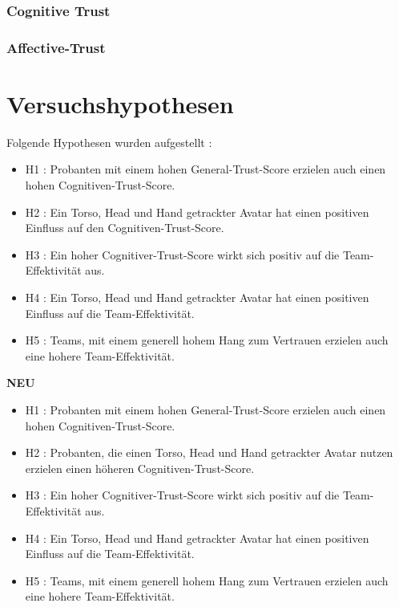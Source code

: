 \documentclass[a4paper,11pt]{article}%
\renewcommand{\\}{\vspace*{0.5\baselineskip} \newline}
\begin{document}
		\subsubsection{Cognitive Trust}
		
		\subsubsection{Affective-Trust}
		
	\newpage
	\section{Versuchshypothesen}

Folgende Hypothesen wurden aufgestellt :
\begin{itemize}
	\item{H1 : Probanten mit einem hohen General-Trust-Score erzielen auch einen hohen Cognitiven-Trust-Score.}
	\item{H2 : Ein Torso, Head und Hand getrackter Avatar hat einen positiven Einfluss auf den Cognitiven-Trust-Score.}
	\item{H3 : Ein hoher Cognitiver-Trust-Score wirkt sich positiv auf die Team-Effektivität aus.}
	\item{H4 : Ein Torso, Head und Hand getrackter Avatar hat einen positiven Einfluss auf die Team-Effektivität.}
	\item{H5 : Teams, mit einem generell hohem Hang zum Vertrauen erzielen auch eine hohere Team-Effektivität.}
\end{itemize}

\textbf{NEU}

\begin{itemize}
	\item{H1 : Probanten mit einem hohen General-Trust-Score erzielen auch einen hohen Cognitiven-Trust-Score.}
	\item{H2 : Probanten, die einen Torso, Head und Hand getrackter Avatar nutzen erzielen einen höheren Cognitiven-Trust-Score.}
	\item{H3 : Ein hoher Cognitiver-Trust-Score wirkt sich positiv auf die Team-Effektivität aus.}
	\item{H4 : Ein Torso, Head und Hand getrackter Avatar hat einen positiven Einfluss auf die Team-Effektivität.}
	\item{H5 : Teams, mit einem generell hohem Hang zum Vertrauen erzielen auch eine hohere Team-Effektivität.}
\end{itemize}
\end{document}
